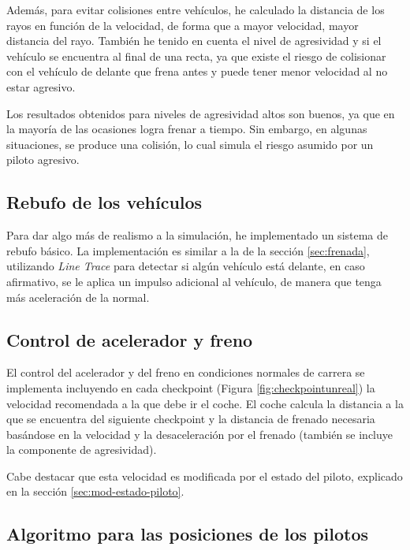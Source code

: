 \bigskip

Además, para evitar colisiones entre vehículos, he calculado la distancia de los rayos en función de la velocidad, de forma que a mayor velocidad, mayor distancia del rayo. También he tenido en cuenta el nivel de agresividad y si el vehículo se encuentra al final de una recta, ya que existe el riesgo de colisionar con el vehículo de delante que frena antes y puede tener menor velocidad al no estar agresivo.

\bigskip

Los resultados obtenidos para niveles de agresividad altos son buenos, ya que en la mayoría de las ocasiones logra frenar a tiempo. Sin embargo, en algunas situaciones, se produce una colisión, lo cual simula el riesgo asumido por un piloto agresivo.


\subsection{Rebufo de los vehículos}

Para dar algo más de realismo a la simulación, he implementado un sistema de rebufo básico. La implementación es similar a la de la sección \ref{sec:frenada}, utilizando \textit{Line Trace} para detectar si algún vehículo está delante, en caso afirmativo, se le aplica un impulso adicional al vehículo, de manera que tenga más aceleración de la normal.

\subsection{Control de acelerador y freno}

El control del acelerador y del freno en condiciones normales de carrera se implementa incluyendo en cada checkpoint (Figura \ref{fig:checkpointunreal}) la velocidad recomendada a la que debe ir el coche. El coche calcula la distancia a la que se encuentra del siguiente checkpoint y la distancia de frenado necesaria basándose en la velocidad y la desaceleración por el frenado (también se incluye la componente de agresividad).

\bigskip

Cabe destacar que esta velocidad es modificada por el estado del piloto, explicado en la sección \ref{sec:mod-estado-piloto}.


\subsection{Algoritmo para las posiciones de los pilotos}

